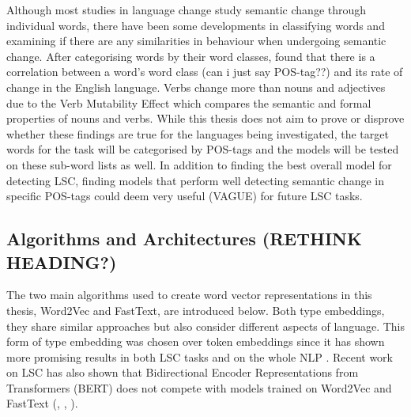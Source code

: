 
Although most studies in language change study semantic change through individual words, there have been some developments in classifying words and examining if there are any similarities in behaviour when undergoing semantic change. After categorising words by their word classes, \citet{dubossarsky2018semantic} found that there is a correlation between a word's word class (can i just say POS-tag??) and its rate of change in the English language. Verbs change more than nouns and adjectives due to the Verb Mutability Effect which compares the semantic and formal properties of nouns and verbs. While this thesis does not aim to prove or disprove whether these findings are true for the languages being investigated, the target words for the task will be categorised by POS-tags and the models will be tested on these sub-word lists as well. In addition to finding the best overall model for detecting LSC, finding models that perform well detecting semantic change in specific POS-tags could deem very useful (VAGUE) for future LSC tasks. 


\subsection{Algorithms and Architectures (RETHINK HEADING?)}
The two main algorithms used to create word vector representations in this thesis, Word2Vec and FastText, are introduced below. Both type embeddings, they share similar approaches but also consider different aspects of language. This form of type embedding was chosen over token embeddings since it has shown more promising results in both LSC tasks and on the whole NLP \citep{baroni-etal-2014-dont}. Recent work on LSC has also shown that Bidirectional Encoder Representations from Transformers (BERT) does not compete with models trained on Word2Vec and FastText (\citet{schlechtweg-etal-2020-semeval}, \citet{kaiser-diacrita2020}, \citet{laicher-2020}). 

